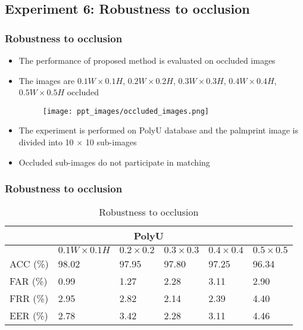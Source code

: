 \documentclass{beamer}
\begin{document}
\subsection{Experiment 6: Robustness to occlusion}
\begin{frame}
\frametitle{Robustness to occlusion}
\begin{itemize}
	\item The performance of proposed method is evaluated on occluded images
	\item The images are $0.1W \times 0.1H$, $0.2W \times 0.2H$, $0.3W \times 0.3H$, $0.4W \times 0.4H$, $0.5W \times 0.5H$ occluded
	\begin{figure}
	\begin{center}
	\texttt{[image: ppt\_images/occluded\_images.png]}
	\end{center}
	\end{figure}
	\item The experiment is performed on PolyU database and the palmprint image is divided into 10 $\times$ 10 sub-images
	\item Occluded sub-images do not participate in matching
\end{itemize}

\end{frame}

\begin{frame}
\frametitle{Robustness to occlusion}
\begin{table}[ht]
\centering 
\begin{tabular}{| l || l | l | l | l | l |}
    \hline
    \multicolumn{6}{|c|}{PolyU}\\
    \hline
    \hline
     & $0.1W \times 0.1H$ & $0.2 \times 0.2$ & $0.3 \times 0.3$ & $0.4 \times 0.4$ & $0.5 \times 0.5$ \\ \hline
    \hline
    ACC (\%) & 98.02 & 97.95 & 97.80 &  97.25 &  96.34\\ \hline
    FAR (\%) & 0.99 & 1.27 & 2.28 & 3.11&  2.90\\ \hline
    FRR (\%) & 2.95 & 2.82 & 2.14 & 2.39&  4.40\\ \hline
    EER (\%) & 2.78 & 3.42&  2.28 & 3.11&  4.46\\ \hline    
\end{tabular}
\caption{Robustness to occlusion\label{table:LST_fil_palm_occ}}
\end{table}
\end{frame}
\end{document}
